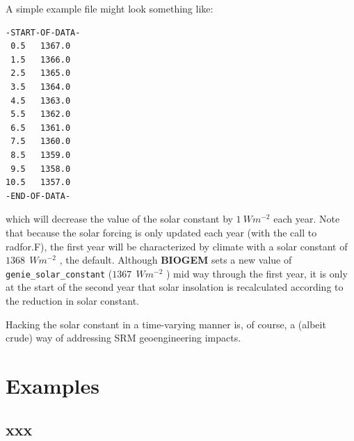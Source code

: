 \documentclass[11pt,fleqn]{book} %
\begin{document}
A simple example file might look something like:
\vspace{-2mm}\small\begin{verbatim}
-START-OF-DATA-
 0.5   1367.0
 1.5   1366.0
 2.5   1365.0
 3.5   1364.0
 4.5   1363.0
 5.5   1362.0
 6.5   1361.0
 7.5   1360.0
 8.5   1359.0
 9.5   1358.0
10.5   1357.0
-END-OF-DATA-
\end{verbatim}\normalsize\vspace{-2mm}
which will decrease the value of the solar constant by \(1 \:W m^{-2}\) each year. Note that because the solar forcing is only updated each year (with the call to \textsf{\footnotesize radfor.F}), the first year will be characterized by climate with a solar constant of \(1368\:\ W m^{-2}\) , the default. Although \textbf{BIOGEM} sets a new value of \texttt{genie\_solar\_constant} (\(1367\:\ W m^{-2}\) ) mid way through the first year, it is only at the start of the second year that solar insolation is recalculated according to the reduction in solar constant.

Hacking the solar constant in a time-varying manner is, of course, a (albeit crude) way of addressing SRM geoengineering impacts.


\cleardoublepage


\chapter{Examples}

\hfill \break


\newpage


\section{xxx}





\end{document}
